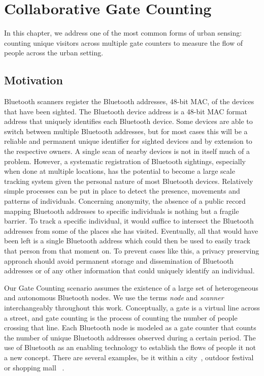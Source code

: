 \chapter{Collaborative Gate Counting}
\label{cha:gate-counting}

In this chapter, we address one of the most common forms of urban
sensing: counting unique visitors across multiple gate counters to
measure the flow of people across the urban setting. 

\section {Motivation}
\label{sec:motivation}

Bluetooth scanners register the Bluetooth addresses, 48-bit MAC, of
the devices that have been sighted. The Bluetooth device address is a
48-bit MAC format address that uniquely identifies each Bluetooth
device. Some devices are able to switch between multiple Bluetooth
addresses, but for most cases this will be a reliable and permanent
unique identifier for sighted devices and by extension to the
respective owners. A single scan of nearby devices is not in itself
much of a problem. However, a systematic registration of Bluetooth
sightings, especially when done at multiple locations, has the
potential to become a large scale tracking system given the personal
nature of most Bluetooth devices. Relatively simple processes can be
put in place to detect the presence, movements and patterns of
individuals. Concerning anonymity, the absence of a public record
mapping Bluetooth addresses to specific individuals is nothing but a
fragile barrier. To track a specific individual, it would suffice to
intersect the Bluetooth addresses from some of the places she has
visited. Eventually, all that would have been left is a single
Bluetooth address which could then be used to easily track that person
from that moment on. To prevent cases like this, a privacy preserving
approach should avoid permanent storage and dissemination of Bluetooth
addresses or of any other information that could uniquely identify an
individual.

Our Gate Counting scenario assumes the existence of a large set
of heterogeneous and autonomous Bluetooth nodes. We use the terms
\emph{node} and \emph{scanner} interchangeably throughout this work.
Conceptually, a gate is a virtual line across a street, and gate
counting is the process of counting the number of people crossing that
line. Each Bluetooth node is modeled as a gate counter that counts the
number of unique Bluetooth addresses observed during a certain period.
The use of Bluetooth as an enabling technology to establish the flows
of people it not a new concept. There are several examples, be it
within a city~\cite{Oneill:2006vq}, outdoor
festival~\cite{versichele2012use} or shopping mall
~\cite{millonig2008shadowing}.

